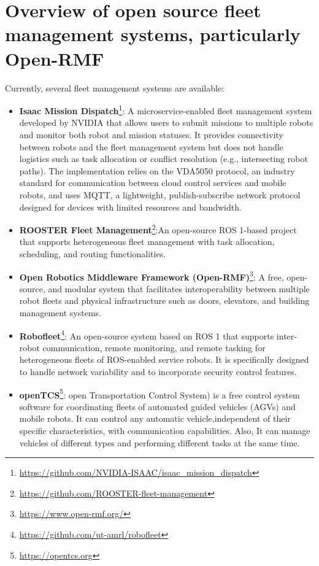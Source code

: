 \chapter{Overview of open source fleet management systems, particularly Open-RMF}
Currently, several fleet management systems are available:
\begin{itemize}
	\item \textbf{Isaac Mission Dispatch}\footnote{\href{https://github.com/NVIDIA-ISAAC/isaac_mission_dispatch}{https://github.com/NVIDIA-ISAAC/isaac\_mission\_dispatch}}: A microservice-enabled fleet management system developed by NVIDIA that allows users to submit missions to multiple robots and monitor both robot and mission statuses. It provides connectivity between robots and the fleet management system but does not handle logistics such as task allocation or conflict resolution (e.g., intersecting robot paths). The implementation relies on the VDA5050 protocol, an industry standard for communication between cloud control services and mobile robots, and uses MQTT, a lightweight, publish-subscribe network protocol designed for devices with limited resources and bandwidth.	
	\item \textbf{ROOSTER Fleet Management}\footnote{\href{https://github.com/ROOSTER-fleet-management}{https://github.com/ROOSTER-fleet-management}}:An open-source ROS 1-based project that supports heterogeneous fleet management with task allocation, scheduling, and routing functionalities.
	\item \textbf{Open Robotics Middleware Framework (Open-RMF)}\footnote{\href{https://www.open-rmf.org/}{https://www.open-rmf.org/}}: A free, open-source, and modular system that facilitates interoperability between multiple robot fleets and physical infrastructure such as doors, elevators, and building management systems.
	\item \textbf{Robofleet}\footnote{\href{https://github.com/ut-amrl/robofleet}{https://github.com/ut-amrl/robofleet}}\cite{sikand2021robofleetopensourcecommunication}: An open-source system based on ROS 1 that supports inter-robot communication, remote monitoring, and remote tasking for heterogeneous fleets of ROS-enabled service robots. It is specifically designed to handle network variability and to incorporate security control features.
	\item \alert{\textbf{openTCS}\footnote{\href{https://opentcs.org}{https://opentcs.org}}: open Transportation Control System) is a free control system software for coordinating fleets of automated guided vehicles (AGVs) and mobile robots. It can control any automatic vehicle,independent of their specific characteristics, with communication capabilities. Also, It can manage vehicles of different types and performing different tasks at the same time.}
\end{itemize}
